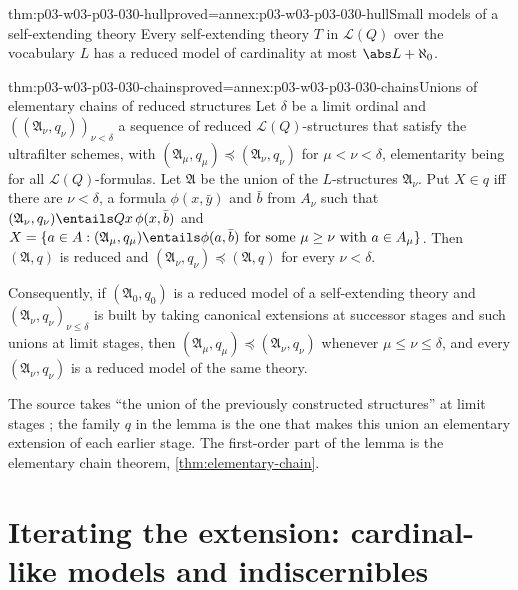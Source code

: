 \begin{hblemma}{thm:p03-w03-p03-030-hull}{proved=annex:p03-w03-p03-030-hull}{Small models of a self-extending theory}
Every self-extending theory \(T\) in \(\mathscr L(Q)\) over the vocabulary
\(L\) has a reduced model of cardinality at most \(\abs L+\aleph_0\).
\end{hblemma}

\begin{hblemma}{thm:p03-w03-p03-030-chains}{proved=annex:p03-w03-p03-030-chains}{Unions of elementary chains of reduced structures}
Let \(\delta\) be a limit ordinal and \(((\mathfrak A_\nu,q_\nu))_{\nu<\delta}\)
a sequence of reduced \(\mathscr L(Q)\)-structures that satisfy the
ultrafilter schemes, with \((\mathfrak A_\mu,q_\mu)\preccurlyeq
(\mathfrak A_\nu,q_\nu)\) for \(\mu<\nu<\delta\), elementarity being for all
\(\mathscr L(Q)\)-formulas.  Let \(\mathfrak A\) be the union of the
\(L\)-structures \(\mathfrak A_\nu\).  Put \(X\in q\) iff there are
\(\nu<\delta\), a formula \(\phi(x,\bar y)\) and \(\bar b\) from \(A_\nu\)
such that \((\mathfrak A_\nu,q_\nu)\entails Qx\,\phi(x,\bar b)\) and
\(X=\{a\in A:(\mathfrak A_\mu,q_\mu)\entails\phi(a,\bar b)\text{ for some
}\mu\ge\nu\text{ with }a\in A_\mu\}\).
Then \((\mathfrak A,q)\) is reduced and \((\mathfrak A_\nu,q_\nu)\preccurlyeq
(\mathfrak A,q)\) for every \(\nu<\delta\).

Consequently, if \((\mathfrak A_0,q_0)\) is a reduced model of a
self-extending theory and \((\mathfrak A_\nu,q_\nu)_{\nu\le\delta}\) is built
by taking canonical extensions at successor stages and such unions at limit
stages, then \((\mathfrak A_\mu,q_\mu)\preccurlyeq(\mathfrak A_\nu,q_\nu)\)
whenever \(\mu\le\nu\le\delta\), and every \((\mathfrak A_\nu,q_\nu)\) is a
reduced model of the same theory.
\end{hblemma}

The source takes ``the union of the previously constructed structures'' at
limit stages \cite[p.~205]{Schmerl1985TransferTheorems}; the family \(q\) in
the lemma is the one that makes this union an elementary extension of each
earlier stage.  The first-order part of the lemma is the elementary chain
theorem, \cref{thm:elementary-chain}.

\section{Iterating the extension: cardinal-like models and indiscernibles}
\label{sec:p03-w03-p03-030-iteration}

